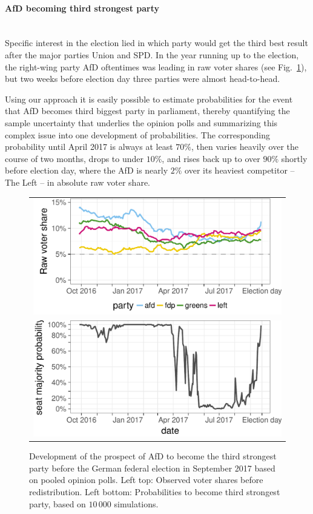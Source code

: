 \documentclass[smallcondensed]{svjour3}     %
\begin{document}
\paragraph{AfD becoming third strongest party} \ \\
Specific interest in the election lied in which party would
get the third best result after the major parties Union and SPD.
In the year running up to the election, the right-wing party
AfD oftentimes was leading in raw voter shares (see Fig.~\ref{fig:2017_afd}),
but two weeks before election day three parties were almost
head-to-head.

Using our approach it is easily possible to estimate probabilities
for the event that AfD becomes third biggest party in parliament,
thereby quantifying the sample uncertainty that underlies the
opinion polls and summarizing this complex issue into one
development of probabilities.
The corresponding probability until April 2017
is always at least $70\%$, then varies heavily over the course
of two months, drops to under $10\%$, and rises back up to
over $90\%$ shortly before election day, where the AfD is
nearly $2\%$ over its heaviest competitor -- The Left -- in
absolute raw voter share.

\begin{figure}[H]\centering
\begin{tabular}{l}
\includegraphics[height=.15\textwidth]{figures/2017_pooled_afd_rawShares.pdf}
\\
\includegraphics[height=.15\textwidth]{figures/2017_pooled_afd_thirdPartyProb.pdf}
\end{tabular}
\caption{Development of the prospect of AfD to become the third strongest party before the German federal election in September 2017 based on pooled opinion polls.
Left top: Observed voter shares before redistribution. Left bottom: Probabilities to become third strongest party, based on $10\,000$ simulations.
\label{fig:2017_afd}
}
\end{figure}
\end{document}
